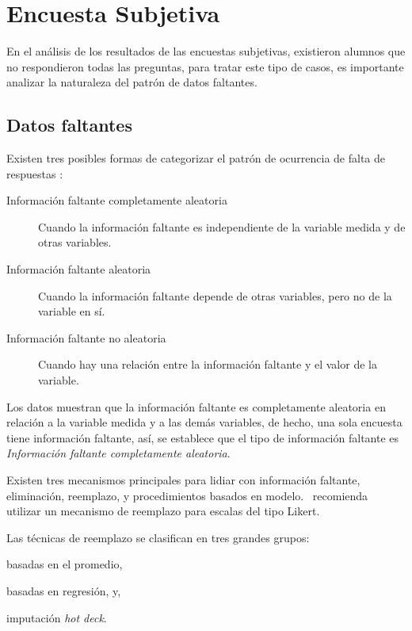 \section{Encuesta Subjetiva}

En el análisis de los resultados de las encuestas subjetivas, existieron alumnos
que no respondieron todas las preguntas, para tratar este tipo de casos, es
importante analizar la naturaleza del patrón de datos
faltantes\cite{carpita2011imputation}. 


\subsection{Datos faltantes}

Existen tres posibles formas de categorizar el patrón de ocurrencia de falta de
respuestas\cite{leite2010performance}
\cite{leite2010performance}\cite{tsikriktsis2005review}:


\begin{description}
    \item[Información faltante completamente aleatoria] Cuando la información
        faltante es independiente de la variable medida y de otras variables.
    \item[Información faltante aleatoria] Cuando la información faltante depende
        de otras variables, pero no de la variable en sí. 
    \item[Información faltante no aleatoria] Cuando hay una relación entre la
        información faltante y el valor de la variable.
\end{description}

Los datos muestran que la información faltante es completamente aleatoria en
relación a la variable medida y a las demás variables, de hecho, una sola
encuesta tiene información faltante, así, se establece que el tipo de
información faltante es \emph{Información faltante completamente aleatoria}.

Existen tres mecanismos\cite{tsikriktsis2005review} principales para lidiar con
información faltante, eliminación, reemplazo, y procedimientos basados en
modelo.~\cite{tsikriktsis2005review} recomienda utilizar un mecanismo de
reemplazo para escalas del tipo Likert.

Las técnicas de reemplazo se clasifican en tres grandes
grupos\cite{tsikriktsis2005review}:
\begin{enumerate*}[label=\itshape\alph*\upshape.]
\item basadas en el promedio,
\item basadas en regresión, y,
\item imputación \emph{hot deck}.
\end{enumerate*}

